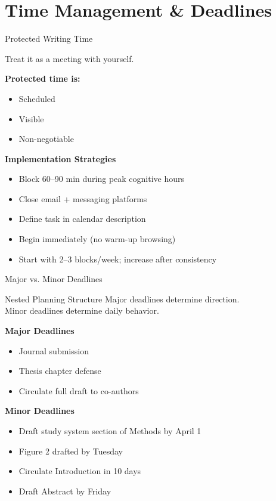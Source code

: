\documentclass{beamer}
\begin{document}
\section{Time Management \& Deadlines}

\begin{frame}{Protected Writing Time}

\begin{block}{Treat it as a meeting with yourself.}
\end{block}

\textbf{Protected time is:}
\begin{itemize}
    \item Scheduled
    \item Visible
    \item Non-negotiable
\end{itemize}


\textbf{Implementation Strategies}
\begin{itemize}
    \item Block 60--90 min during peak cognitive hours
    \item Close email + messaging platforms
    \item Define task in calendar description
    \item Begin immediately (no warm-up browsing)
    \item Start with 2--3 blocks/week; increase after consistency
\end{itemize}

\end{frame}


\begin{frame}{Major vs. Minor Deadlines}

\begin{block}{Nested Planning Structure}
Major deadlines determine direction.\\
Minor deadlines determine daily behavior.
\end{block}

\textbf{Major Deadlines}
\begin{itemize}
    \item Journal submission
    \item Thesis chapter defense
    \item Circulate full draft to co-authors
\end{itemize}

\textbf{Minor Deadlines}
\begin{itemize}
    \item Draft study system section of Methods by April 1
    \item Figure 2 drafted by Tuesday
    \item Circulate Introduction in 10 days
    \item Draft Abstract by Friday
\end{itemize}

\end{frame}
\end{document}
